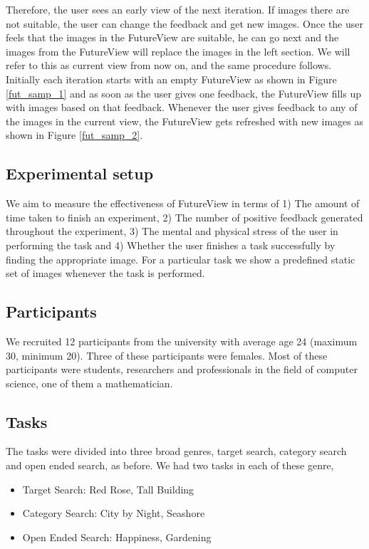 \documentclass[english]{tktltiki}
\begin{document}
Therefore, the user sees an early view of the next iteration. If images there are not suitable, the user can change the feedback and get new images. Once the user feels that the images in the FutureView are suitable, he can go next and the images from the FutureView will replace the images in the left section. We will refer to this as current view from now on, and the same procedure follows. Initially each iteration starts with an empty FutureView as shown in Figure \ref{fut_samp_1} and as soon as the user gives one feedback, the FutureView fills up with images based on that feedback. Whenever the user gives feedback to any of the images in the current view, the FutureView gets refreshed with new images as shown in Figure \ref{fut_samp_2}.

\subsection{Experimental setup}

We aim to measure the effectiveness of FutureView in terms of 1) The amount of time taken to finish an experiment, 2) The number of positive feedback generated throughout the experiment, 3) The mental and physical stress of the user in performing the task and 4) Whether the user finishes a task successfully by finding the appropriate image. For a particular task we show a predefined static set of images whenever the task is performed.

\subsection{Participants}

We recruited 12 participants from the university with average age 24 (maximum 30, minimum 20). Three of these participants were females. Most of these participants were students, researchers and professionals in the field of computer science, one of them a mathematician.





\subsection{Tasks}

The tasks were divided into three broad genres, target search, category search and open ended search, as before. We had two tasks in each of these genre,

\begin{itemize}
	\item Target Search: Red Rose, Tall Building
	\item Category Search: City by Night, Seashore
	\item Open Ended Search: Happiness, Gardening
\end{itemize}
\end{document}

